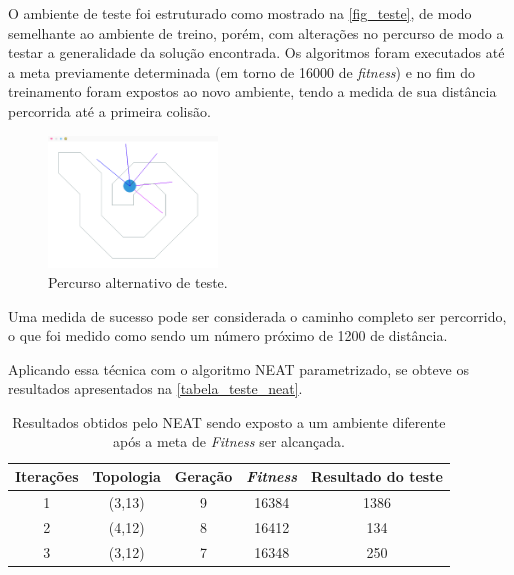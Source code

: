 O ambiente de teste foi estruturado como mostrado na \autoref{fig_teste}, de
modo semelhante ao ambiente de treino, por{\'e}m, com altera{\c c}{\~o}es no
percurso de modo a testar a generalidade da solu{\c c}{\~a}o encontrada. Os
algoritmos foram executados at{\'e} a meta previamente determinada (em torno de
16000 de \textit{fitness}) e no fim do treinamento foram expostos ao novo
ambiente, tendo a medida de sua dist{\^a}ncia percorrida at{\'e} a primeira
colis{\~a}o.

\begin{figure}[htb]
        \centering
        \caption{\label{fig_teste}Percurso alternativo de teste.}
        \includegraphics[width=0.4\textwidth]{images/teste.png}
\end{figure}

Uma medida de sucesso pode ser considerada o caminho completo ser percorrido, o que foi
medido como sendo um número próximo de 1200 de dist{\^a}ncia.

Aplicando essa t{\'e}cnica com o algoritmo NEAT parametrizado, se obteve os
resultados apresentados na \autoref{tabela_teste_neat}.

\begin{table}[htb]
	\centering
	\caption{\label{tabela_teste_neat}Resultados obtidos pelo NEAT sendo exposto a um ambiente diferente ap{\'o}s a meta de \textit{Fitness} ser alcançada.}
    \begin{tabular}{ccccc}
        \hline
		\textbf{Itera{\c c}{\~o}es} & \textbf{Topologia} & \textbf{Gera{\c c}{\~a}o} & \textbf{\textit{Fitness}} & \textbf{Resultado do teste} \\ \hline
		1 & (3,13)  & 9   & 16384  & 1386   \\ \hline
		2 & (4,12)  & 8   & 16412  & 134    \\ \hline
		3 & (3,12)  & 7   & 16348  & 250    \\ \hline
    \end{tabular}
\end{table}

